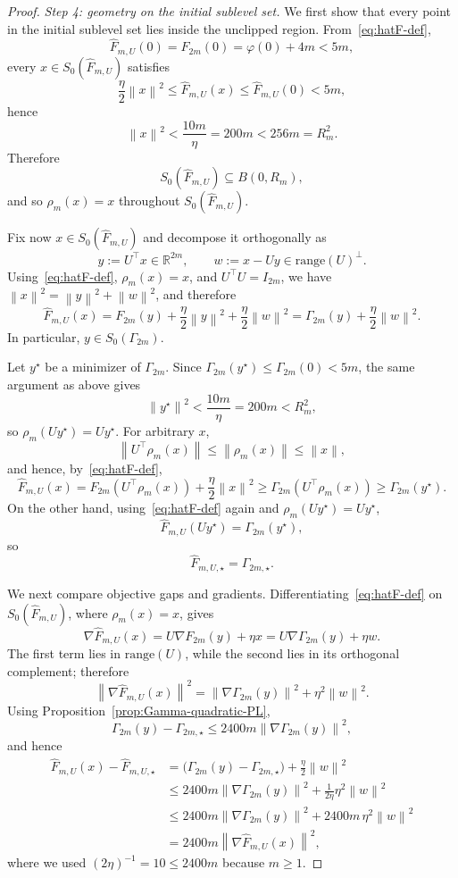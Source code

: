 \documentclass[11pt]{article}
\newcommand{\R}{\mathbb{R}}
\newcommand{\norm}[1]{\left\lVert #1\right\rVert}
\begin{document}
\begin{proof}
\emph{Step 4: geometry on the initial sublevel set.}
We first show that every point in the initial sublevel set lies inside the unclipped region.
From~\eqref{eq:hatF-def},
\[
\widehat F_{m,U}(0)=F_{2m}(0)=\varphi(0)+4m<5m,
\]
every $x\in S_0(\widehat F_{m,U})$ satisfies
\[
\frac{\eta}{2}\norm{x}^2\le \widehat F_{m,U}(x)\le \widehat F_{m,U}(0)<5m,
\]
hence
\[
\norm{x}^2<\frac{10m}{\eta}=200m<256m=R_m^2.
\]
Therefore
\[
S_0(\widehat F_{m,U})\subseteq B(0,R_m),
\]
and so $\rho_m(x)=x$ throughout $S_0(\widehat F_{m,U})$.

Fix now $x\in S_0(\widehat F_{m,U})$ and decompose it orthogonally as
\[
y:=U^\top x\in\R^{2m},
\qquad
w:=x-Uy\in \mathrm{range}(U)^\perp.
\]
Using~\eqref{eq:hatF-def}, $\rho_m(x)=x$, and $U^\top U=I_{2m}$, we have
$\norm{x}^2=\norm{y}^2+\norm{w}^2$, and therefore
\[
\widehat F_{m,U}(x)=F_{2m}(y)+\frac{\eta}{2}\norm{y}^2+\frac{\eta}{2}\norm{w}^2=\Gamma_{2m}(y)+\frac{\eta}{2}\norm{w}^2.
\]
In particular, $y\in S_0(\Gamma_{2m})$.

Let $y^\star$ be a minimizer of $\Gamma_{2m}$.
Since $\Gamma_{2m}(y^\star)\le \Gamma_{2m}(0)<5m$, the same argument as above gives
\[
\norm{y^\star}^2<\frac{10m}{\eta}=200m<R_m^2,
\]
so $\rho_m(Uy^\star)=Uy^\star$.
For arbitrary $x$,
\[
\norm{U^\top \rho_m(x)}\le \norm{\rho_m(x)}\le \norm{x},
\]
and hence, by~\eqref{eq:hatF-def},
\[
\widehat F_{m,U}(x)=F_{2m}(U^\top \rho_m(x))+\frac{\eta}{2}\norm{x}^2\ge \Gamma_{2m}(U^\top \rho_m(x))\ge \Gamma_{2m}(y^\star).
\]
On the other hand, using~\eqref{eq:hatF-def} again and $\rho_m(Uy^\star)=Uy^\star$,
\[
\widehat F_{m,U}(Uy^\star)=\Gamma_{2m}(y^\star),
\]
so
\[
\widehat F_{m,U,\star}=\Gamma_{2m,\star}.
\]

We next compare objective gaps and gradients.
Differentiating~\eqref{eq:hatF-def} on $S_0(\widehat F_{m,U})$, where $\rho_m(x)=x$, gives
\[
\nabla \widehat F_{m,U}(x)=U\nabla F_{2m}(y)+\eta x=U\nabla \Gamma_{2m}(y)+\eta w.
\]
The first term lies in $\mathrm{range}(U)$, while the second lies in its orthogonal complement; therefore
\[
\norm{\nabla \widehat F_{m,U}(x)}^2=\norm{\nabla \Gamma_{2m}(y)}^2+\eta^2\norm{w}^2.
\]
Using Proposition~\ref{prop:Gamma-quadratic-PL},
\[
\Gamma_{2m}(y)-\Gamma_{2m,\star}\le 2400m\norm{\nabla \Gamma_{2m}(y)}^2,
\]
and hence
\[
\begin{aligned}
\widehat F_{m,U}(x)-\widehat F_{m,U,\star}
&=
\bigl(\Gamma_{2m}(y)-\Gamma_{2m,\star}\bigr)+\frac{\eta}{2}\norm{w}^2\\
&\le
2400m\norm{\nabla \Gamma_{2m}(y)}^2+\frac{1}{2\eta}\eta^2\norm{w}^2\\
&\le
2400m\norm{\nabla \Gamma_{2m}(y)}^2+2400m\,\eta^2\norm{w}^2\\
&=
2400m\norm{\nabla \widehat F_{m,U}(x)}^2,
\end{aligned}
\]
where we used $(2\eta)^{-1}=10\le 2400m$ because $m\ge 1$.


\end{proof}
\end{document}
